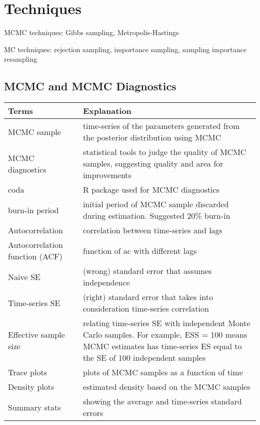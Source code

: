       \section{Techniques}

      MCMC techniques: Gibbs sampling, Metropolis-Hastings

      MC techniques: rejection sampling, importance
      sampling, sampling importance resampling

      \subsection{MCMC and MCMC Diagnostics}

      \begin{tabulary}{\linewidth}{l L}
          \hline
          Terms & Explanation\\
          \hline
          \hline
          MCMC sample & time-series of the
          parameters generated from the posterior
          distribution using MCMC\\
          MCMC diagnostics & statistical tools to judge the
          quality of MCMC samples, suggesting quality and
          area for improvements\\
          coda & R package used for MCMC diagnostics\\
          burn-in period & initial period of MCMC sample
          discarded during estimation. Suggested 20\%
          burn-in\\
          Autocorrelation & correlation between time-series
          and lags\\
          Autocorrelation function (ACF) & function of ac
          with different lags\\
          Naive SE & (wrong) standard error that assumes
          independence\\
          Time-series SE & (right) standard error that takes
          into consideration time-series correlation\\
          Effective sample size & relating time-series SE
          with independent Monte Carlo samples. For example,
          ESS = 100 means MCMC estimates has time-series ES
          equal to the SE of 100 independent samples\\
          Trace plots & plots of MCMC samples as a function
          of time\\
          Density plots & estimated density based on the MCMC
          samples\\
          Summary stats & showing the average and
          time-series standard errors
      \end{tabulary}

